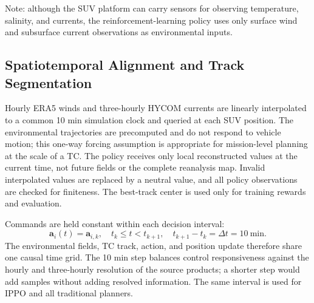 \documentclass[a4paper,fleqn]{cas-dc}
\begin{document}
\begin{table}[htbp]
\centering
\caption{Environmental datasets used to construct the 500-TC observation
environments. The dataset integrates ERA5 surface winds, HYCOM currents at
seven depths, and IBTrACS best tracks.}
\label{tab:data}
\par\smallskip
\parbox{\textwidth}{\footnotesize
Note: although the SUV platform can carry sensors for observing temperature,
salinity, and currents, the reinforcement-learning policy uses only surface
wind and subsurface current observations as environmental inputs.}
\end{table}

\subsection{Spatiotemporal Alignment and Track Segmentation}

Hourly ERA5 winds and three-hourly HYCOM currents are linearly interpolated to
a common 10 min simulation clock and queried at each SUV position. The
environmental trajectories are precomputed and do not respond to vehicle
motion; this one-way forcing assumption is appropriate for mission-level
planning at the scale of a TC. The policy receives only local reconstructed
values at the current time, not future fields or the complete reanalysis map.
Invalid interpolated values are replaced by a neutral value, and all policy
observations are checked for finiteness. The best-track center is used only for
training rewards and evaluation.

Commands are held constant within each decision interval:
\begin{equation}
\mathbf{a}_i(t)=\mathbf{a}_{i,k},
\quad t_k\leq t<t_{k+1},
\quad t_{k+1}-t_k=\Delta t=10\ \mathrm{min}.
\label{eq:zero_order_hold}
\end{equation}
The environmental fields, TC track, action, and position update therefore share
one causal time grid. The 10 min step balances control responsiveness against
the hourly and three-hourly resolution of the source products; a shorter step
would add samples without adding resolved information. The same interval is
used for IPPO and all traditional planners.
\end{document}
